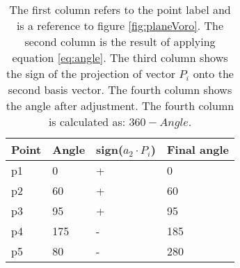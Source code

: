 \begin{table}[h]
    \centering
    \begin{tabular}{llll}
    \hline
    Point & Angle & sign($a_2 \cdot P_i$) & Final angle \\ \hline
    p1             & 0              & +                 & 0                               \\
    p2             & 60             & +                 & 60                              \\
    p3             & 95             & +                 & 95                              \\
    p4             & 175            & -                 & 185                             \\
    p5             & 80             & -                 & 280                             \\ \hline
    \end{tabular}
    \caption{The first column refers to the point label and is a reference to figure \ref{fig:planeVoro}. The second column is the result of applying equation \ref{eq:angle}. The third column shows the sign of the projection of vector $P_i$ onto the second basis vector. The fourth column shows the angle after adjustment. The fourth column is calculated as: $360 - Angle$.}
    \label{tab:angles}
\end{table}

